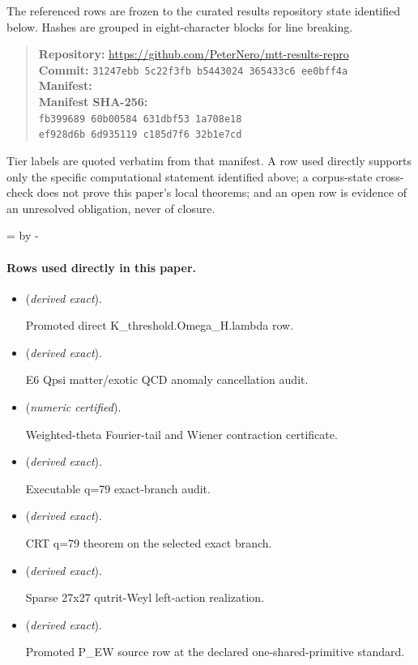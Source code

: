 \documentclass[11pt]{article}
\begin{document}
The referenced rows are frozen to the curated results repository state identified below. Hashes are grouped in eight-character blocks for line breaking.
\begin{quote}\small
\textbf{Repository:} \url{https://github.com/PeterNero/mtt-results-repro}\\
\textbf{Commit:} \texttt{31247ebb 5c22f3fb b5443024 365433c6 ee0bff4a}\\
\textbf{Manifest:} \\
\textbf{Manifest SHA-256:}\\
\texttt{fb399689 60b00584 631dbf53 1a708e18}\\
\texttt{ef928d6b 6d935119 c185d7f6 32b1e7cd}
\end{quote}

Tier labels are quoted verbatim from that manifest. A row used directly supports only the specific computational statement identified above; a corpus-state cross-check does not prove this paper's local theorems; and an open row is evidence of an unresolved obligation, never of closure.

\par\begingroup{}=\pagegoal\advance{} by -\pagetotal\ifdim\dimen0<7\baselineskip\newpage\fi\endgroup
\paragraph{Rows used directly in this paper.}
\begin{itemize}
\setlength{\itemsep}{0.25em}
\item {} (\emph{derived exact}).\par Promoted direct K\_threshold.Omega\_H.lambda row.
\item {} (\emph{derived exact}).\par E6 Qpsi matter/exotic QCD anomaly cancellation audit.
\item {} (\emph{numeric certified}).\par Weighted-theta Fourier-tail and Wiener contraction certificate.
\item {} (\emph{derived exact}).\par Executable q=79 exact-branch audit.
\item {} (\emph{derived exact}).\par CRT q=79 theorem on the selected exact branch.
\item {} (\emph{derived exact}).\par Sparse 27x27 qutrit-Weyl left-action realization.
\item {} (\emph{derived exact}).\par Promoted P\_EW source row at the declared one-shared-primitive standard.
\end{itemize}
\end{document}
